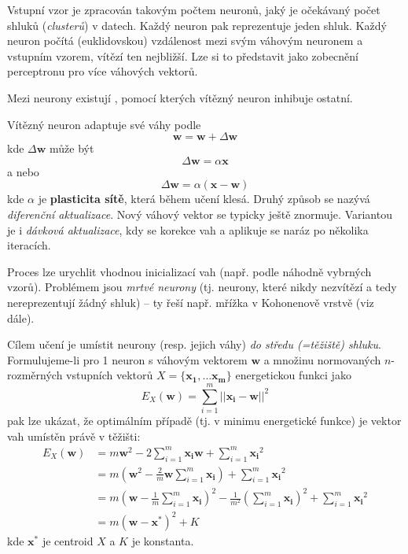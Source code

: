\documentclass[11pt]{report} %
\renewcommand{\vec}[1]{\mathbf{#1}}
\numberwithin{equation}{section}
\begin{document}
Vstupní vzor je zpracován takovým počtem neuronů, jaký je očekávaný počet shluků (\textit{clusterů}) v datech. Každý neuron pak reprezentuje jeden shluk. Každý neuron počítá (euklidovskou) vzdálenost mezi svým váhovým neuronem a vstupním vzorem, vítězí ten nejbližší. Lze si to představit jako zobecnění perceptronu pro více váhových vektorů.

Mezi neurony existují , pomocí kterých vítězný neuron inhibuje ostatní. 

Vítězný neuron adaptuje své váhy podle
$$\vec{w} = \vec{w} + \Delta \vec{w}$$
kde $\Delta \vec{w}$ může být
$$\Delta \vec{w} = \alpha\vec{x}$$
a nebo
$$\Delta \vec{w} = \alpha(\vec{x} - \vec{w})$$
kde $\alpha$ je \textbf{plasticita sítě}, která během učení klesá. Druhý způsob se nazývá \textit{diferenční aktualizace}. Nový váhový vektor se typicky ještě znormuje. Variantou je i \textit{dávková aktualizace}, kdy se korekce vah  a aplikuje se naráz po několika iteracích.

Proces lze urychlit vhodnou inicializací vah (např. podle náhodně vybrných vzorů). Problémem jsou \textit{mrtvé neurony} (tj. neurony, které nikdy nezvítězí a tedy nereprezentují žádný shluk) -- ty řeší např. mřížka v Kohonenově vrstvě (viz dále).

Cílem učení je umístit neurony (resp. jejich váhy) \textit{do středu (=těžiště) shluku}. Formulujeme-li pro 1 neuron s váhovým vektorem $\vec{w}$ a množinu normovaných $n$-rozměrných vstupních vektorů $X = \{\vec{x_1},\dots \vec{x_m} \}$ energetickou funkci jako
$$E_X(\vec{w}) = \sum\limits_{i=1}^{m}||\vec{x_i} - \vec{w}||^2$$
pak lze ukázat, že optimálním případě (tj. v minimu energetické funkce) je vektor vah umístěn právě v těžišti:
\begin{align*}
	E_X(\vec{w}) &= m\vec{w}^2 - 2\sum\limits_{i=1}^{m}\vec{x_i}\vec{w} + \sum\limits_{i=1}^{m} \vec{x_i}^2 \\
	&=m\left(\vec{w}^2 - \frac{2}{m}\vec{w}\sum\limits_{i=1}^{m}\vec{x_i}\right) + \sum\limits_{i=1}^{m} \vec{x_i}^2 \\
	&=m\left(\vec{w} - \frac{1}{m}\sum\limits_{i=1}^{m}\vec{x_i}\right)^2 - \frac{1}{m^2}\left(\sum\limits_{i=1}^{m}\vec{x_i}\right)^2 + \sum\limits_{i=1}^{m} \vec{x_i}^2 \\
	&=m(\vec{w} - \vec{x^*})^2 + K
\end{align*}
kde $\vec{x^*}$ je centroid $X$ a $K$ je konstanta.
\end{document}

